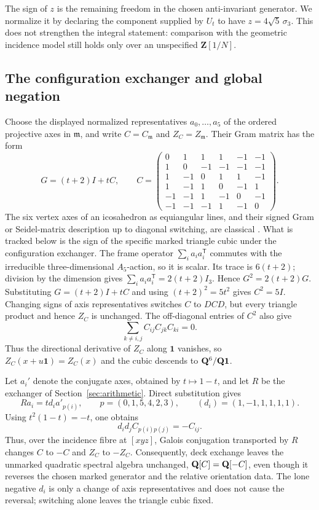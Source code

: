 The sign of \(z\) is the remaining freedom in the chosen anti-invariant
generator.  We normalize it by declaring the component supplied by \(U_t\)
to have \(z=4\sqrt5\,\sigma_3\).  This does not strengthen the integral
statement: comparison with the geometric incidence model still holds only
over an unspecified \(\mathbf Z[1/N]\).

\subsection{The configuration exchanger and global negation}

Choose the displayed normalized representatives
\(a_0,\ldots,a_5\) of the ordered projective axes in \(\mathfrak m\), and
write \(C=C_{\mathfrak m}\) and \(Z_C=Z_{\mathfrak m}\).  Their Gram
matrix has the form
\[
 G=(t+2)I+tC,
\qquad
C=\begin{pmatrix}
0&1&1&1&-1&-1\\
1&0&-1&-1&-1&-1\\
1&-1&0&1&1&-1\\
1&-1&1&0&-1&1\\
-1&-1&1&-1&0&-1\\
-1&-1&-1&1&-1&0
\end{pmatrix}.
\]
The six vertex axes of an icosahedron as equiangular lines, and their signed
Gram or Seidel-matrix description up to diagonal switching, are classical
\cite[\S3]{GodsilProblems}.  What is tracked below is the sign of the
specific marked triangle cubic under the configuration exchanger.
The frame operator \(\sum_i a_ia_i^{\mathsf T}\) commutes with the
irreducible three-dimensional \(A_5\)-action, so it is scalar.  Its trace is
\(6(t+2)\); division by the dimension gives
\(\sum_i a_ia_i^{\mathsf T}=2(t+2)I_3\).  Hence
\(G^2=2(t+2)G\).  Substituting \(G=(t+2)I+tC\) and using
\((t+2)^2=5t^2\) gives \(C^2=5I\).  Changing signs of axis
representatives switches \(C\) to \(DCD\), but every triangle product and
hence \(Z_C\) is unchanged.  The off-diagonal entries of \(C^2\) also give
\[
 \sum_{k\ne i,j}C_{ij}C_{jk}C_{ki}=0.
\]
Thus the directional derivative of \(Z_C\) along \(\mathbf1\) vanishes, so
\(Z_C(x+u\mathbf1)=Z_C(x)\) and the cubic descends to
\(\mathbf Q^6/\mathbf Q\mathbf1\).

Let \(a_i'\) denote the conjugate axes, obtained by \(t\mapsto1-t\), and
let \(R\) be the exchanger of Section~\ref{sec:arithmetic}.  Direct
substitution gives
\[
 Ra_i=t d_i a'_{p(i)},\qquad
 p=(0,1,5,4,2,3),\qquad
 (d_i)=(1,-1,1,1,1,1).
\]
Using \(t^2(1-t)=-t\), one obtains
\[
 d_id_jC_{p(i)p(j)}=-C_{ij}.
\]
Thus, over the incidence fibre at \([xyz]\), Galois conjugation transported
by \(R\) changes \(C\)
to \(-C\) and \(Z_C\) to \(-Z_C\).  Consequently, deck exchange leaves the unmarked
quadratic spectral algebra unchanged, \(\mathbf Q[C]=\mathbf Q[-C]\), even though it reverses
the chosen marked generator and the relative orientation data.  The lone
negative \(d_i\) is only a change of axis representatives and does not cause
the reversal; switching alone leaves the triangle cubic fixed.

